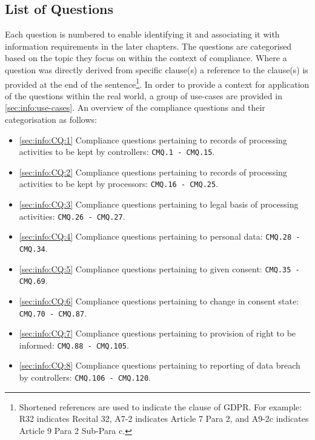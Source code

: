 \subsection{List of Questions}\label{sec:info:compliance-questions-list}
Each question is numbered to enable identifying it and associating it with information requirements in the later chapters. The questions are categorised based on the topic they focus on within the context of compliance. Where a question was directly derived from specific clause(s) a reference to the clause(s) is provided at the end of the sentence\footnote{Shortened references are used to indicate the clause of GDPR. For example: R32 indicates Recital 32, A7-2 indicates Article 7 Para 2, and A9-2c indicates Article 9 Para 2 Sub-Para c.}.
In order to provide a context for application of the questions within the real world, a group of use-cases are provided in \autoref{sec:info:use-cases}.
An overview of the compliance questions and their categorisation as follows:
\begin{itemize}
	\item \autoref{sec:info:CQ:1} Compliance questions pertaining to records of processing activities to be kept by controllers: \texttt{CMQ.1 - CMQ.15}.
	\item \autoref{sec:info:CQ:2} Compliance questions pertaining to records of processing activities to be kept by processors: \texttt{CMQ.16 - CMQ.25}.
	\item \autoref{sec:info:CQ:3} Compliance questions pertaining to legal basis of processing activities: \texttt{CMQ.26 - CMQ.27}.
	\item \autoref{sec:info:CQ:4} Compliance questions pertaining to personal data: \texttt{CMQ.28 - CMQ.34}.
	\item \autoref{sec:info:CQ:5} Compliance questions pertaining to given consent: \texttt{CMQ.35 - CMQ.69}.
	\item \autoref{sec:info:CQ:6} Compliance questions pertaining to change in consent state: \texttt{CMQ.70 - CMQ.87}.
	\item \autoref{sec:info:CQ:7} Compliance questions pertaining to provision of right to be informed: \texttt{CMQ.88 - CMQ.105}.
	\item \autoref{sec:info:CQ:8} Compliance questions pertaining to reporting of data breach by controllers: \texttt{CMQ.106 - CMQ.120}.
\end{itemize} 

